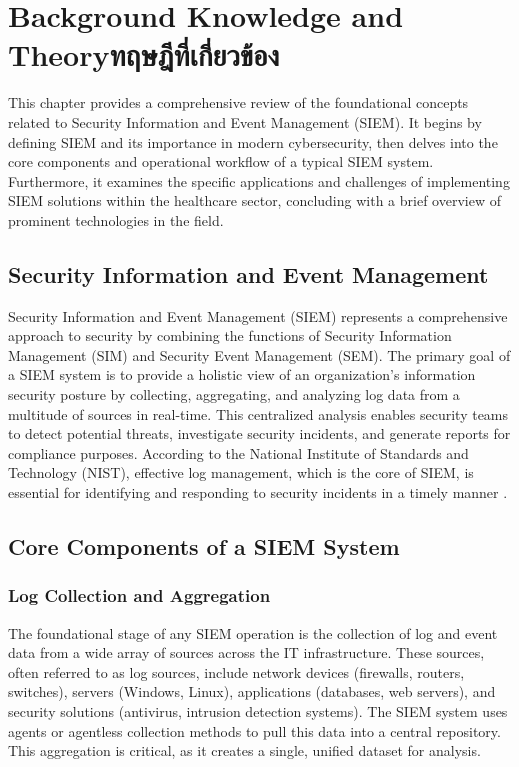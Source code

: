 \chapter{\ifenglish Background Knowledge and Theory\else ทฤษฎีที่เกี่ยวข้อง\fi}

This chapter provides a comprehensive review of the foundational concepts related to Security Information and Event Management (SIEM). It begins by defining SIEM and its importance in modern cybersecurity, then delves into the core components and operational workflow of a typical SIEM system. Furthermore, it examines the specific applications and challenges of implementing SIEM solutions within the healthcare sector, concluding with a brief overview of prominent technologies in the field.

\section{Security Information and Event Management}
\label{sec:what-is-siem}
Security Information and Event Management (SIEM) represents a comprehensive approach to security by combining the functions of Security Information Management (SIM) and Security Event Management (SEM). The primary goal of a SIEM system is to provide a holistic view of an organization's information security posture by collecting, aggregating, and analyzing log data from a multitude of sources in real-time. This centralized analysis enables security teams to detect potential threats, investigate security incidents, and generate reports for compliance purposes. According to the National Institute of Standards and Technology (NIST), effective log management, which is the core of SIEM, is essential for identifying and responding to security incidents in a timely manner \cite{nist_sp800-92}.


\section{Core Components of a SIEM System}
\subsection{Log Collection and Aggregation}
\label{sec:siem-components}
The foundational stage of any SIEM operation is the collection of log and event data from a wide array of sources across the IT infrastructure. These sources, often referred to as log sources, include network devices (firewalls, routers, switches), servers (Windows, Linux), applications (databases, web servers), and security solutions (antivirus, intrusion detection systems). The SIEM system uses agents or agentless collection methods to pull this data into a central repository. This aggregation is critical, as it creates a single, unified dataset for analysis. \cite{chapple_cybersecurity}

